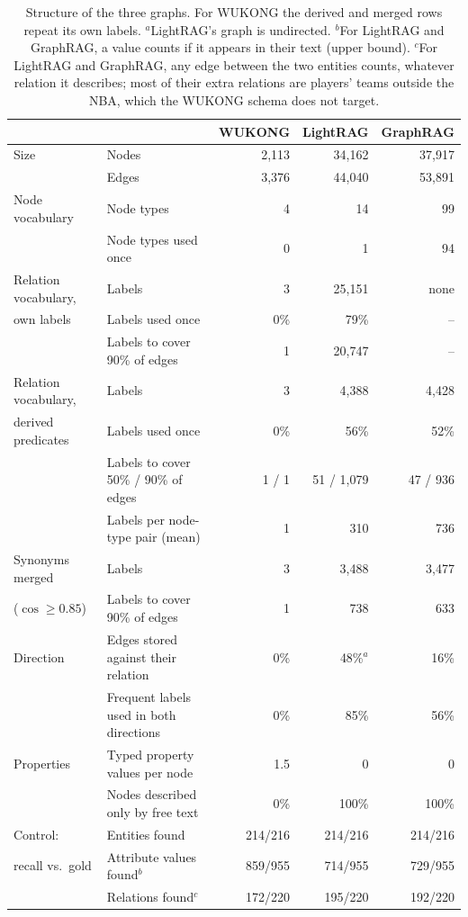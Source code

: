 \documentclass[11pt]{article}
\newcommand{\wk}{WUKONG}
\begin{document}
\begin{table}[h]
\centering
\small
\begin{tabular}{llrrr}
\toprule
 & & \wk & LightRAG & GraphRAG \\
\midrule
Size & Nodes & 2,113 & 34,162 & 37,917 \\
 & Edges & 3,376 & 44,040 & 53,891 \\
\midrule
Node vocabulary & Node types & 4 & 14 & 99 \\
 & Node types used once & 0 & 1 & 94 \\
\midrule
Relation vocabulary, & Labels & 3 & 25,151 & none \\
own labels & Labels used once & 0\% & 79\% & -- \\
 & Labels to cover 90\% of edges & 1 & 20,747 & -- \\
\midrule
Relation vocabulary, & Labels & 3 & 4,388 & 4,428 \\
derived predicates & Labels used once & 0\% & 56\% & 52\% \\
 & Labels to cover 50\% / 90\% of edges & 1 / 1 & 51 / 1,079 & 47 / 936 \\
 & Labels per node-type pair (mean) & 1 & 310 & 736 \\
\midrule
Synonyms merged & Labels & 3 & 3,488 & 3,477 \\
($\cos \ge 0.85$) & Labels to cover 90\% of edges & 1 & 738 & 633 \\
\midrule
Direction & Edges stored against their relation & 0\% & 48\%$^{a}$ & 16\% \\
 & Frequent labels used in both directions & 0\% & 85\% & 56\% \\
\midrule
Properties & Typed property values per node & 1.5 & 0 & 0 \\
 & Nodes described only by free text & 0\% & 100\% & 100\% \\
\midrule
Control: & Entities found & 214/216 & 214/216 & 214/216 \\
recall vs.\ gold & Attribute values found$^{b}$ & 859/955 & 714/955 & 729/955 \\
 & Relations found$^{c}$ & 172/220 & 195/220 & 192/220 \\
\bottomrule
\end{tabular}
\caption{Structure of the three graphs. For \wk{} the derived and merged rows repeat its own
labels. $^{a}$LightRAG's graph is undirected. $^{b}$For LightRAG and GraphRAG, a value counts if
it appears in their text (upper bound). $^{c}$For LightRAG and GraphRAG, any edge between the two
entities counts, whatever relation it describes; most of their extra relations are players' teams
outside the NBA, which the \wk{} schema does not target.}
\label{tab:e1}
\end{table}
\end{document}
